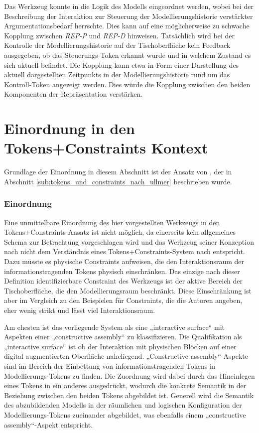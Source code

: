 Das Werkzeug konnte in die Logik des Modells eingeordnet werden, wobei bei der Beschreibung der Interaktion zur Steuerung der Modellierungshistorie verstärkter Argumentationsbedarf herrschte. Dies kann auf eine möglicherweise zu schwache Kopplung zwischen \emph{REP-P} und \emph{REP-D} hinweisen. Tatsächlich wird bei der Kontrolle der Modellierungshistorie auf der Tischoberfläche kein Feedback ausgegeben, ob das Steuerungs-Token erkannt wurde und in welchem Zustand es sich aktuell befindet. Die Kopplung kann etwa in Form einer Darstellung des aktuell dargestellten Zeitpunkts in der Modellierungshistorie rund um das Kontroll-Token angezeigt werden. Dies würde die Kopplung zwischen den beiden Komponenten der Repräsentation verstärken.


\section{Einordnung in den Tokens+Constraints Kontext} %
\label{sec:einordnung_in_den_tokens_constraints_kontext}

Grundlage der Einordnung in diesem Abschnitt ist der Ansatz von \citet{Ullmer05}, der in Abschnitt \ref{sub:tokens_und_constraints_nach_ullmer} beschrieben wurde.

\subsubsection{Einordnung}

Eine unmittelbare Einordnung des hier vorgestellten Werkzeugs in den Tokens+Constraints-Ansatz ist nicht möglich, da einerseits kein allgemeines Schema zur Betrachtung vorgeschlagen wird und das Werkzeug seiner Konzeption nach nicht dem Verständnis eines Tokens+Constraints-System nach \citet{Ullmer05} entspricht. Dazu müsste es physische Constraints aufweisen, die den Interaktionsraum der informationstragenden Tokens physisch einschränken. Das einzige nach dieser Definition identifizierbare Constraint des Werkzeugs ist der aktive Bereich der Tischoberfläche, die den Modellierungsraum beschränkt. Diese Einschränkung ist aber im Vergleich zu den Beispielen für Constraints, die die Autoren angeben, eher wenig strikt und lässt viel Interaktionsraum.

Am ehesten ist das vorliegende System als eine „interactive surface“ mit Aspekten einer „constructive assembly“ zu klassifizieren. Die Qualifikation als „interactive surface“ ist ob der Interaktion mit physischen Blöcken auf einer digital augmentierten Oberfläche naheliegend. „Constructive assembly“-Aspekte sind im Bereich der Einbettung von informationstragenden Tokens in Modellierungs-Tokens zu finden. Die Zuordnung wird dabei durch das Hineinlegen eines Tokens in ein anderes ausgedrückt, wodurch die konkrete Semantik in der Beziehung zwischen den beiden Tokens abgebildet ist. Generell wird die Semantik des abzubildenden Modells in der räumlichen und logischen Konfiguration der Modellierungs-Tokens zueinander abgebildet, was ebenfalls einem „constructive assembly“-Aspekt entspricht.

